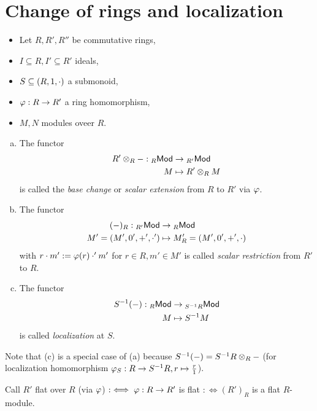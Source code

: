 \documentclass[a4paper]{report}
\begin{document}
\section{Change of rings and localization}
\begin{nota*}
\begin{itemize}
  \item Let $R, R', R''$ be commutative rings,
  \item $I \subseteq R, I' \subseteq R'$ ideals,
  \item $S \subseteq (R,1,\cdot)$ a submonoid,
  \item $\varphi: R \to R'$ a ring homomorphism,
  \item $M, N$ modules oveer $R$.
\end{itemize}
\end{nota*}

\begin{defi}
\begin{enumerate}[(a)]
  \item The functor
        \begin{align*}
          R' \otimes_{R} - : {}_R\mathsf{Mod} &\to {}_{R'}\mathsf{Mod}\\
          M &\mapsto R' \otimes_{R} M
        \end{align*}
        is called the \emph{base change} or \emph{scalar extension} from $R$ to $R'$ via $\varphi$.
  \item The functor
        \begin{align*}
          (-)_{R}: {}_{R'}\mathsf{Mod} &\to {}_R\mathsf{Mod}\\
          M' = (M',0',+',\cdot') &\mapsto M'_{R} = (M',0',+',\cdot)
        \end{align*}
        with $r \cdot m' := \varphi(r) \cdot ' m'$ for $r \in R, m' \in M'$ is called \emph{scalar restriction} from $R'$ to $R$.
  \item The functor
        \begin{align*}
          S^{-1}(-): {}_R\mathsf{Mod} &\to {}_{S^{-1}R}\mathsf{Mod} \\
          M &\mapsto S^{-1}M
        \end{align*}
        is called \emph{localization} at $S$.
\end{enumerate}
\end{defi}
\begin{rem*}
Note that (c) is a special case of (a) because $S^{-1}(-) = S^{-1}R \otimes_{R} -$ (for localization homomorphism $\varphi_{S}: R \to S^{-1}R, r \mapsto \frac r 1$).
\end{rem*}
\begin{defi*}
Call $R'$ flat over $R$ (via $\varphi$) $: \iff \varphi: R \to R'$ is flat $:\iff (R')_{R}$ is a flat $R$-module.
\end{defi*}
\end{document}

